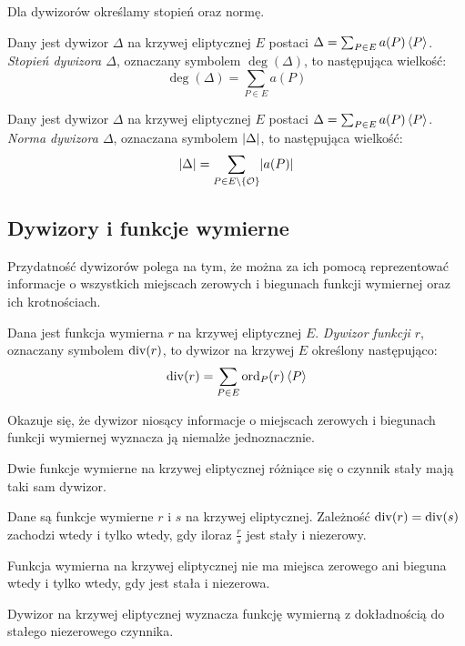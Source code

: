 \noindent
Dla dywizorów określamy stopień oraz normę.

\begin{definition}
Dany jest dywizor $\Delta$ na krzywej eliptycznej $E$
postaci $\Delta = \sum_{P \in E} a(P)\left\langle P\right\rangle$.
\emph{Stopień dywizora $\Delta$},
oznaczany symbolem $\deg(\Delta)$,
to następująca wielkość:
\begin{equation*}
\deg(\Delta) = \sum_{P \in E} a(P)
\end{equation*}
\end{definition}

\begin{definition}
Dany jest dywizor $\Delta$ na krzywej eliptycznej $E$
postaci $\Delta = \sum_{P \in E} a(P)\left\langle P\right\rangle$.
\emph{Norma dywizora $\Delta$},
oznaczana symbolem $\lvert\Delta\rvert$,
to następująca wielkość:
\begin{equation*}
\lvert\Delta\rvert = \sum_{P \in E \setminus \{\mathcal{O}\}} \lvert a(P)\rvert
\end{equation*}
\end{definition}

\subsection*{Dywizory i funkcje wymierne}

\noindent
Przydatność dywizorów polega na tym, że można za ich pomocą
reprezentować informacje
o wszystkich miejscach zerowych i biegunach funkcji wymiernej
oraz ich krotnościach.

\begin{definition}
Dana jest funkcja wymierna $r$ na krzywej eliptycznej $E$.
\emph{Dywizor funkcji $r$},
oznaczany symbolem $\operatorname{div}(r)$,
to dywizor na krzywej $E$ określony następująco:
\begin{equation*}
\operatorname{div}(r) = \sum_{P \in E} \operatorname{ord}_P(r)\left\langle P\right\rangle
\end{equation*}
\end{definition}

\noindent
Okazuje się, że dywizor niosący informacje o miejscach zerowych i biegunach
funkcji wymiernej wyznacza ją niemalże jednoznacznie.

\begin{fact}
Dwie funkcje wymierne na krzywej eliptycznej
różniące się o czynnik stały mają taki sam dywizor.
\end{fact}

\begin{theorem}
Dane są funkcje wymierne $r$ i $s$ na krzywej eliptycznej.
Zależność $\operatorname{div}(r) = \operatorname{div}(s)$ zachodzi wtedy i tylko wtedy,
gdy iloraz $\frac{r}{s}$ jest stały i niezerowy.
\end{theorem}

\begin{corollary}\label{zero_div_const_fun_coro}
Funkcja wymierna na krzywej eliptycznej
nie ma miejsca zerowego ani bieguna wtedy i tylko wtedy,
gdy jest stała i niezerowa.
\end{corollary}

\begin{corollary}\label{fun_divi_equiv_to_const_lemma}
Dywizor na krzywej eliptycznej
wyznacza funkcję wymierną z dokładnością do stałego niezerowego czynnika.
\end{corollary}
